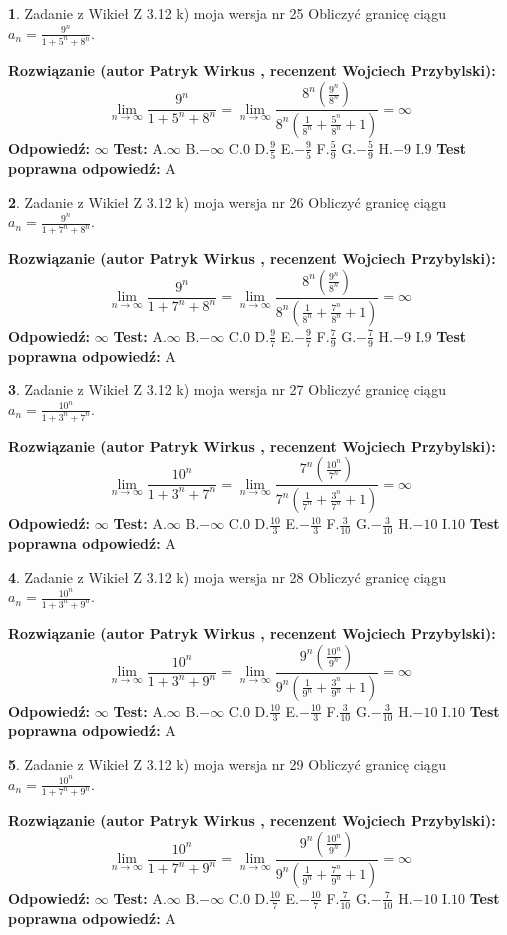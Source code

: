 \documentclass[12pt, a4paper]{article}
\theoremstyle{definition} %
\newtheorem{zad}{}
\newcommand{\zadStart}[1]{\begin{zad}#1\newline}
\newcommand{\zadStop}{\end{zad}}
\newcommand{\rozwStart}[2]{\noindent \textbf{Rozwiązanie (autor #1 , recenzent #2): }\newline}
\newcommand{\rozwStop}{\newline}
\newcommand{\odpStart}{\noindent \textbf{Odpowiedź:}\newline}
\newcommand{\odpStop}{\newline}
\newcommand{\testStart}{\noindent \textbf{Test:}\newline}
\newcommand{\testStop}{\newline}
\newcommand{\kluczStart}{\noindent \textbf{Test poprawna odpowiedź:}\newline}
\newcommand{\kluczStop}{\newline}
\begin{document}
\zadStart{Zadanie z Wikieł Z 3.12 k) moja wersja nr 25}
Obliczyć granicę ciągu $a_{n}=\frac{9^{n}}{1+5^{n} + 8^{n}}$.
\zadStop
\rozwStart{Patryk Wirkus}{Wojciech Przybylski}
$$\lim\limits_{n\to\infty}\frac{9^{n}}{1+5^{n} + 8^{n}}=
\lim\limits_{n\to\infty}\frac{8^{n}(\frac{9^{n}}{8^{n}} )}{8^{n}(\frac{1}{8^{n}}+\frac{5^{n}}{8^{n}}+1)} = \infty$$
\rozwStop
\odpStart
$\infty$
\odpStop
\testStart
A.$\infty$
B.$-\infty$
C.$0$
D.$\frac{9}{5}$
E.$-\frac{9}{5}$
F.$\frac{5}{9}$
G.$-\frac{5}{9}$
H.$-9$
I.$9$
\testStop
\kluczStart
A
\kluczStop



\zadStart{Zadanie z Wikieł Z 3.12 k) moja wersja nr 26}
Obliczyć granicę ciągu $a_{n}=\frac{9^{n}}{1+7^{n} + 8^{n}}$.
\zadStop
\rozwStart{Patryk Wirkus}{Wojciech Przybylski}
$$\lim\limits_{n\to\infty}\frac{9^{n}}{1+7^{n} + 8^{n}}=
\lim\limits_{n\to\infty}\frac{8^{n}(\frac{9^{n}}{8^{n}} )}{8^{n}(\frac{1}{8^{n}}+\frac{7^{n}}{8^{n}}+1)} = \infty$$
\rozwStop
\odpStart
$\infty$
\odpStop
\testStart
A.$\infty$
B.$-\infty$
C.$0$
D.$\frac{9}{7}$
E.$-\frac{9}{7}$
F.$\frac{7}{9}$
G.$-\frac{7}{9}$
H.$-9$
I.$9$
\testStop
\kluczStart
A
\kluczStop



\zadStart{Zadanie z Wikieł Z 3.12 k) moja wersja nr 27}
Obliczyć granicę ciągu $a_{n}=\frac{10^{n}}{1+3^{n} + 7^{n}}$.
\zadStop
\rozwStart{Patryk Wirkus}{Wojciech Przybylski}
$$\lim\limits_{n\to\infty}\frac{10^{n}}{1+3^{n} + 7^{n}}=
\lim\limits_{n\to\infty}\frac{7^{n}(\frac{10^{n}}{7^{n}} )}{7^{n}(\frac{1}{7^{n}}+\frac{3^{n}}{7^{n}}+1)} = \infty$$
\rozwStop
\odpStart
$\infty$
\odpStop
\testStart
A.$\infty$
B.$-\infty$
C.$0$
D.$\frac{10}{3}$
E.$-\frac{10}{3}$
F.$\frac{3}{10}$
G.$-\frac{3}{10}$
H.$-10$
I.$10$
\testStop
\kluczStart
A
\kluczStop



\zadStart{Zadanie z Wikieł Z 3.12 k) moja wersja nr 28}
Obliczyć granicę ciągu $a_{n}=\frac{10^{n}}{1+3^{n} + 9^{n}}$.
\zadStop
\rozwStart{Patryk Wirkus}{Wojciech Przybylski}
$$\lim\limits_{n\to\infty}\frac{10^{n}}{1+3^{n} + 9^{n}}=
\lim\limits_{n\to\infty}\frac{9^{n}(\frac{10^{n}}{9^{n}} )}{9^{n}(\frac{1}{9^{n}}+\frac{3^{n}}{9^{n}}+1)} = \infty$$
\rozwStop
\odpStart
$\infty$
\odpStop
\testStart
A.$\infty$
B.$-\infty$
C.$0$
D.$\frac{10}{3}$
E.$-\frac{10}{3}$
F.$\frac{3}{10}$
G.$-\frac{3}{10}$
H.$-10$
I.$10$
\testStop
\kluczStart
A
\kluczStop



\zadStart{Zadanie z Wikieł Z 3.12 k) moja wersja nr 29}
Obliczyć granicę ciągu $a_{n}=\frac{10^{n}}{1+7^{n} + 9^{n}}$.
\zadStop
\rozwStart{Patryk Wirkus}{Wojciech Przybylski}
$$\lim\limits_{n\to\infty}\frac{10^{n}}{1+7^{n} + 9^{n}}=
\lim\limits_{n\to\infty}\frac{9^{n}(\frac{10^{n}}{9^{n}} )}{9^{n}(\frac{1}{9^{n}}+\frac{7^{n}}{9^{n}}+1)} = \infty$$
\rozwStop
\odpStart
$\infty$
\odpStop
\testStart
A.$\infty$
B.$-\infty$
C.$0$
D.$\frac{10}{7}$
E.$-\frac{10}{7}$
F.$\frac{7}{10}$
G.$-\frac{7}{10}$
H.$-10$
I.$10$
\testStop
\kluczStart
A
\kluczStop
\end{document}

